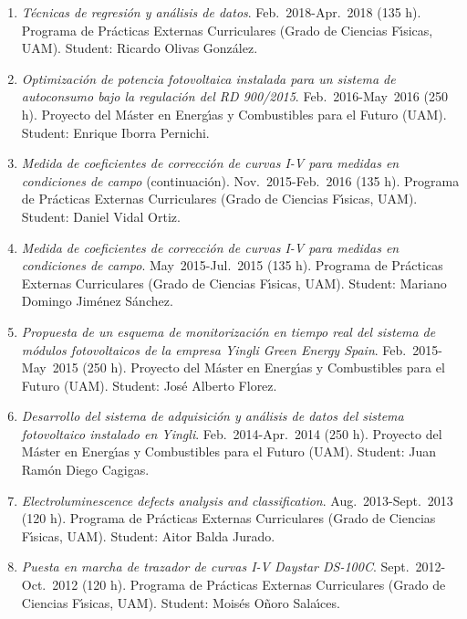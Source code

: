 \documentclass{article}
\begin{document}
\begin{enumerate}
\item
{\it T\'ecnicas de regresi\'on y an\'alisis de datos}.
Feb.~2018-Apr.~2018 (135 h). Programa de Pr\'acticas Externas Curriculares (Grado de Ciencias F{\'\i}sicas, UAM).
Student: Ricardo Olivas Gonz\'alez.

\item
{\it Optimizaci\'on de potencia fotovoltaica instalada para un sistema de autoconsumo bajo la regulaci\'on del RD 900/2015}.
Feb.~2016-May~2016 (250 h). Proyecto del M\'aster en Energ{\'\i}as y Combustibles para el Futuro (UAM).
Student: Enrique Iborra Pernichi.

\item
{\it Medida de coeficientes de correcci\'on de curvas I-V para medidas en condiciones de campo} (conti\-nu\-aci\'on).
Nov.~2015-Feb.~2016 (135 h). Programa de Pr\'acticas Externas Curriculares (Grado de Ciencias F{\'\i}sicas, UAM).
Student: Daniel Vidal Ortiz.

\item
{\it Medida de coeficientes de correcci\'on de curvas I-V para medidas en condiciones de campo}.
May~2015-Jul.~2015 (135 h). Programa de Pr\'acticas Externas Curriculares (Grado de Ciencias F{\'\i}sicas, UAM).
Student: Mariano Domingo Jim\'enez S\'anchez.

\item
{\it Propuesta de un esquema de monitorizaci\'on en tiempo real del sistema de m\'odulos fotovoltaicos de la empresa Yingli Green Energy Spain}.
Feb.~2015-May~2015 (250 h). Proyecto del M\'aster en Energ{\'\i}as y Combustibles para el Futuro (UAM).
Student: Jos\'e Alberto Florez.

\item
{\it Desarrollo del sistema de adquisici\'on y an\'alisis de datos del sistema fotovoltaico instalado en Yingli}.
Feb.~2014-Apr.~2014 (250 h). Proyecto del M\'aster en Energ{\'\i}as y Combustibles para el Futuro (UAM).
Student: Juan Ram\'on Diego Cagigas.

\item
{\it Electroluminescence defects analysis and classification}.
Aug.~2013-Sept.~2013 (120 h). Programa de Pr\'acticas Externas Curriculares (Grado de Ciencias F{\'\i}sicas, UAM).
Student: Aitor Balda Jurado.

\item
{\it Puesta en marcha de trazador de curvas I-V Daystar DS-100C}.
Sept.~2012-Oct.~2012 (120 h). Programa de Pr\'acticas Externas Curriculares (Grado de Ciencias F\'{\i}sicas, UAM).
Student: Mois\'es O\~noro Sala\'{\i}ces. 
\end{enumerate}
\end{document}
